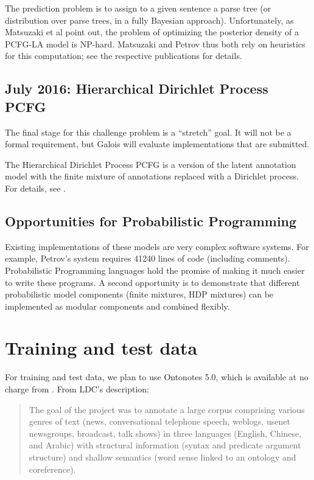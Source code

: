 \documentclass[english]{article}
\begin{document}
The prediction problem is to assign to a given sentence a parse tree (or distribution over parse trees, in a fully Bayesian approach). Unfortunately, as Matsuzaki et al point out, the problem of optimizing the posterior density of a PCFG-LA model is NP-hard. Matsuzaki and Petrov thus both rely on heuristics for this computation; see the respective publications for details.

\subsection{July 2016: Hierarchical Dirichlet Process PCFG}

The final stage for this challenge problem is a ``stretch'' goal. It will not be a formal requirement, but Galois will evaluate implementations that are submitted.

The Hierarchical Dirichlet Process PCFG is a version of the latent annotation model with the finite mixture of annotations replaced with a Dirichlet process. For details, see \citet{Liang2007, Liang2009}.

\subsection{Opportunities for Probabilistic Programming}

Existing implementations of these models are very complex software systems. For example, Petrov's system requires 41240 lines of code (including comments). Probabilistic Programming languages hold the promise of making it much easier to write these programs.  A second opportunity is to demonstrate that different probabilistic model components (finite mixtures, HDP mixtures) can be implemented as modular components and combined flexibly.

\section{Training and test data}

For training and test data, we plan to use Ontonotes 5.0, which is available at no charge from \citet{LDC2013}. From LDC's description: 
\begin{quote}
The goal of the project was to annotate a large corpus comprising various genres of text (news, conversational telephone speech, weblogs, usenet newsgroups, broadcast, talk shows) in three languages (English, Chinese, and Arabic) with structural information (syntax and predicate argument structure) and shallow semantics (word sense linked to an ontology and coreference).
\end{quote}
\end{document}
